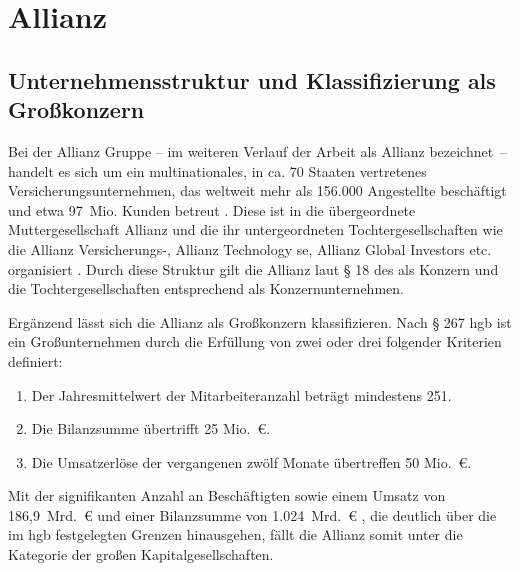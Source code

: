 \section{Allianz}

\subsection{Unternehmensstruktur und Klassifizierung als Großkonzern} %
Bei der Allianz Gruppe -- im weiteren Verlauf der Arbeit als Allianz bezeichnet~-- handelt es sich um ein multinationales, in ca.
70 Staaten vertretenes Versicherungsunternehmen, das weltweit mehr als 156.000 Angestellte beschäftigt und etwa 97~Mio. Kunden betreut
\cite{allianzFactSheet}. Diese ist in die übergeordnete Muttergesellschaft Allianz  und die ihr untergeordneten Tochtergesellschaften wie die Allianz Versicherungs-,
Allianz Technology \gls{se}, Allianz Global Investors  etc. organisiert
\cite{allianzKonzern,allianz2025structure}. Durch diese Struktur gilt die Allianz laut § 18 des 
\cite{aktg} als Konzern und die Tochtergesellschaften entsprechend als Konzernunternehmen.

Ergänzend lässt sich die Allianz als Großkonzern klassifizieren. Nach § 267 \gls{hgb} \cite{hgb} ist ein
Großunternehmen durch die Erfüllung von zwei oder drei folgender Kriterien definiert:
\begin{enumerate}
    \item Der Jahresmittelwert der Mitarbeiteranzahl beträgt mindestens 251.
    \item Die Bilanzsumme übertrifft 25 Mio.~€.
    \item Die Umsatzerlöse der vergangenen zwölf Monate übertreffen 50 Mio.~€.
\end{enumerate}

Mit der signifikanten Anzahl an Beschäftigten sowie einem Umsatz von 186,9~Mrd.~€ \cite{geschäftsbericht2025,allianzFactSheet} und einer
Bilanzsumme von 1.024~Mrd.~€ \cite{geschäftsbericht2025}, die deutlich über die im \gls{hgb} festgelegten Grenzen hinausgehen, fällt
die Allianz somit unter die Kategorie der großen Kapitalgesellschaften.

